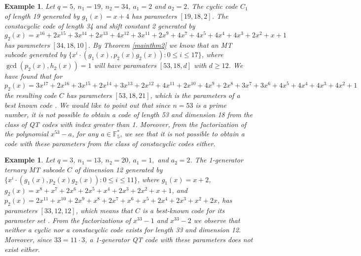 \documentclass[preprint,12pt]{elsarticle}
\newtheorem{Example}[Theorem]{Example}
\begin{document}
\begin{Example}
Let $q=5$, $n_1=19$, $n_2=34$, $a_1=2$ and $a_2=2$. The cyclic code $C_1$ of length 19 generated by 
$g_1(x)=x+4$ has parameters $[19, 18, 2]$. The constacyclic code of length 34 and shift constant 2 generated by $g_2(x)= x^{16} + 2x^{15} + 3x^{14} + 2x^{13} + 4x^{12} + 3x^{11} + 2x^9 + 4x^7 + 4x^5 + 4x^4 + 4x^3 + 2x^2 + x + 1$ has parameters $[34, 18, 10]$. By Theorem \ref{mainthm2} we know that an MT subcode generated by $\{x^i\cdot (g_1(x),p_2(x)g_2(x)): 0\leq i\leq 17\}$, where $\gcd(p_2(x),h_2(x))=1$ will have paramaters $[53,18,d]$ with $d\geq 12$.  We have found that for $p_2(x) =3x^{17} + 2x^{16} + 3x^{15} + 2x^{14} + 3x^{13} + 2x^{12} + 4x^{11} + 2x^{10} + 4x^9 + 2x^8 + 3x^7 + 3x^6 + 4x^5 + 4x^4 + 4x^3 + 4x^2 + 1$ the resulting code $C$ has parameters $[53, 18, 21]$, which is the parameters of a best known code \cite{table}. We would like to point out that since $n=53$ is a prime number, it is not possible to obtain a code of length 53 and dimension 18 from the class of QT codes with index greater than 1. Moreover, from the factorization of the polynomial $x^{53}-a$, for any $a\in \mathbb{F}^*_5$, we see that it is not possible to obtain a code with these parameters from the class of constacyclic codes either.  
\end{Example}

\begin{Example}
Let $q=3$, $n_1=13$, $n_2=20$, $a_1=1,$ and $a_2=2$. The 1-generator ternary MT subcode $C$ of dimension 12 generated by
$\{x^i\cdot (g_1(x),p_2(x)g_2(x)): 0\leq i\leq 11\}$, where $g_1(x)=x+2$, $g_2(x)=x^8 + x^7 + 2x^6 + 2x^5 + x^4 + 2x^3 + 2x^2 + x + 1$, and $p_2(x)=2x^{11} + x^{10} + 2x^9 + x^8 + 2x^7 + x^6 + x^5 + 2x^4 + 2x^3 + x^2 + 2x$, has parameters $[33,12,12]$, which means that $C$ is a best-known code for its parameter set \cite{table}. From the factorizations of $x^{33}-1$ and $x^{33}-2$ we observe that neither a cyclic nor a constacyclic code exists for length 33 and dimension 12. Moreover, since $33=11\cdot 3$, a 1-generator QT code with these parameters does not exist either. 

\end{Example}



\end{document}
